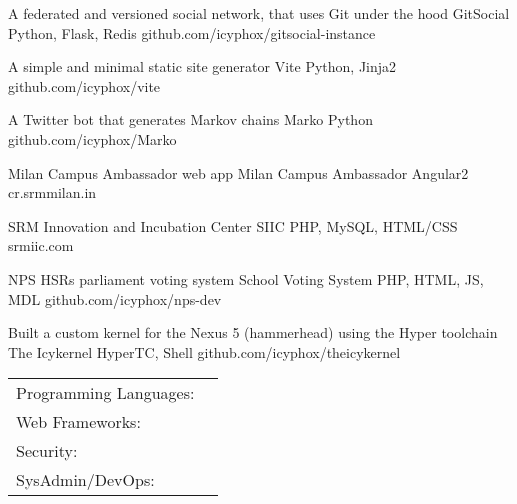 \documentclass[]{awesome-cv}
\begin{document}
\vspace{-2mm}
\begin{cventries}
	\cventry
	{A federated and versioned social network, that uses Git under the hood}
	{GitSocial}
	{Python, Flask, Redis}
	{github.com/icyphox/gitsocial-instance}
	{}

	\vspace{-5mm}
	\cventry
	{A simple and minimal static site generator}
	{Vite}
	{Python, Jinja2}
	{github.com/icyphox/vite}
	{}

	\vspace{-5mm}
	\cventry
	{A Twitter bot that generates Markov chains}
	{Marko}
	{Python}
	{github.com/icyphox/Marko}
	{}
	
	\vspace{-5mm}
	\cventry
	{Milan Campus Ambassador web app}
	{Milan Campus Ambassador}
	{Angular2}
	{cr.srmmilan.in}
	{}
	
	\vspace{-5mm}
	\cventry
	{SRM Innovation and Incubation Center}
	{SIIC}
	{PHP, MySQL, HTML/CSS}
	{srmiic.com}
	{}
	
	\vspace{-5mm}
	\cventry
	{NPS HSR\textquotesingle{}s parliament voting system}
	{School Voting System}
	{PHP, HTML, JS, MDL}
	{github.com/icyphox/nps-dev}
	{}

	\vspace{-5mm}
	\cventry
	{Built a custom kernel for the Nexus 5 (hammerhead) using the Hyper toolchain}
	{The Icykernel}
	{HyperTC, Shell}
	{github.com/icyphox/theicykernel}
	{}
	
	\vspace{-5mm}
\end{cventries}
\begin{cventries}
	\cventry
	{}
	{\def\arraystretch{1.15}{\begin{tabular}{ l l }
		Programming Languages:  & {\skill{ Python, Shell, C, JS, PHP, HTML/CSS}} \\
		Web Frameworks:  & {\skill{ Flask, Angular2, Hugo, Bootstrap, Materialize/MDL}} \\
		Security: & {\skill{ Metasploit framework, Nmap, Kali toolset }} \\
		SysAdmin/DevOps:  & {\skill{ Unix tools/CLI, AWS, Digital Ocean, Git, TravisCI}} \\
		\end{tabular}}}
	{}
	{}
	{}
\end{cventries}
\end{document}
